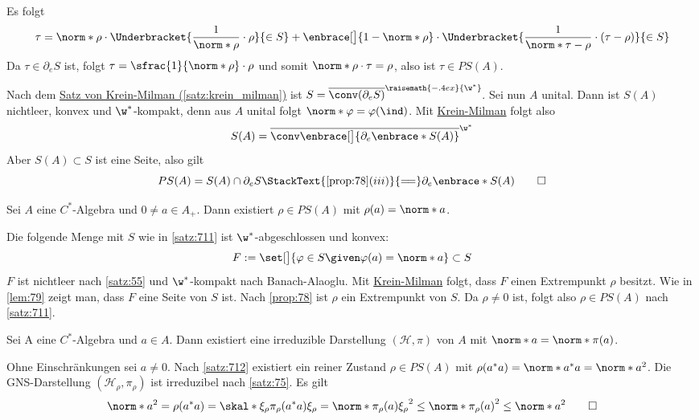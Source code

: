 \begin{beweis}
\begin{itemize}
		Es folgt
		\[
			\tau = \norm*{\rho} \cdot \Underbracket{\frac{1}{\norm*{\rho}} \cdot \rho}{\in S} + \enbrace[\big]{1- \norm*{\rho}} \cdot \Underbracket{\frac{1}{\norm*{\tau - \rho}} \cdot (\tau - \rho)}{\in S}  
		\]
		Da $\tau \in \partial_e S$ ist, folgt $\tau = \sfrac{1}{\norm*{\rho}} \cdot \rho$ und somit $\norm*{\rho} \cdot \tau =\rho$, also ist $\tau \in PS(A)$.
	\end{itemize}
	Nach dem \hyperref[satz:krein_milman]{Satz von Krein-Milman (\ref*{satz:krein_milman})} ist $S= \overline{\conv(\partial_e S)}^{\raisemath{-.4ex}{\w^*}}\!$.
	Sei nun $A$ unital.
	Dann ist $S(A)$ nichtleer, konvex und $\w^*$-kompakt, denn aus $A$ unital folgt $\norm*{\varphi}=\varphi(\ind)$.
	Mit \hyperref[satz:krein_milman]{Krein-Milman} folgt also
	\[
		S(A) = \overline{\conv \enbrace[\big]{\partial_e \enbrace*{S(A)}}}^{\w^*}
	\]
	Aber $S(A) \subset S$ ist eine Seite, also gilt 
	\[
		PS(A) =S(A) \cap \partial_e S \StackText{\ref{prop:78}(iii)}{=\joinrel=} \partial_e \enbrace*{S(A)} \qedhere
	\]
\end{beweis}

\begin{satz}[label=satz:712,{name=[{reiner Zustand der Norm von $a \in A$ realisiert}]}]
	Sei $A$ eine $C^*$-Algebra und $0\neq a \in A_+$.
	Dann existiert $\rho \in PS(A)$ mit $\rho(a)=\norm*{a}$.
\end{satz}
\begin{beweis}
	Die folgende Menge mit $S$ wie in \autoref{satz:711} ist $\w^*$-abgeschlossen und konvex:
	\[
		F := \set[\big]{\varphi \in S \given \varphi(a)=\norm*{a}} \subset S
	\]
	$F$ ist nichtleer nach \autoref{satz:55} und $\w^*$-kompakt nach Banach-Alaoglu.
	Mit \hyperref[satz:krein_milman]{Krein-Milman} folgt, dass $F$ einen Extrempunkt $\rho$ besitzt.
	Wie in \autoref{lem:79} zeigt man, dass $F$ eine Seite von $S$ ist.
	Nach \autoref{prop:78} ist $\rho$ ein Extrempunkt von $S$.
	Da $\rho\neq0$ ist, folgt also $\rho \in PS(A)$ nach \autoref{satz:711}.
\end{beweis}

\begin{korollar}[label=korr:713,{name=[{irreduzible Darstellung, die die Norm von $a \in A$ erhält}]}]
	Sei A eine $C^*$-Algebra und $a \in A$.
	Dann existiert eine irreduzible Darstellung $(\mathcal{H},\pi)$ von $A$ mit $\norm*{a}= \norm*{\pi(a)}$.
\end{korollar}
\begin{beweis}
	Ohne Einschränkungen sei $a \neq 0$.
	Nach \autoref{satz:712} existiert ein reiner Zustand $\rho \in PS(A)$ mit $\rho(a^*a)=\norm*{a^*a}=\norm*{a}^2$.
	Die GNS-Darstellung $(\mathcal{H}_\rho,\pi_\rho)$ ist irreduzibel nach \autoref{satz:75}.
	Es gilt
	\[
		\norm*{a}^2 = \rho(a^*a) = \skal*{\xi_\rho}{\pi_\rho(a^*a)\xi_\rho} = \norm*{\pi_\rho(a) \xi_\rho}^2 \le \norm*{\pi_\rho(a)}^2 \le \norm*{a}^2 \qedhere
	\]
\end{beweis}


